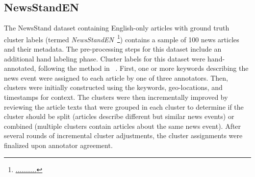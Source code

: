 \subsection{NewsStandEN}
The NewsStand dataset containing English-only articles with ground truth cluster labels (termed \emph{NewsStandEN}~\footnote{\url{...........}}) contains a sample of 100 news articles and their metadata.
The pre-processing steps for this dataset include an additional hand labeling phase.
Cluster labels for this dataset were hand-annotated, following the method in \citeauthor{Zhang2023}~\cite{Zhang2023}.
First, one or more keywords describing the news event were assigned to each article by one of three annotators.
Then, clusters were initially constructed using the keywords, geo-locations, and timestamps for context.
The clusters were then incrementally improved by reviewing the article texts that were grouped in each cluster to determine if the cluster should be split (articles describe different but similar news events) or combined (multiple clusters contain articles about the same news event).
After several rounds of incremental cluster adjustments, the cluster assignments were finalized upon annotator agreement.